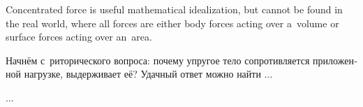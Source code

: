 

{\small
Concentrated force is useful mathematical idealization, but cannot be found in the real world, where all forces are either body forces acting over a~volume or surface forces acting over an~area.
\par}

\begin{otherlanguage}{russian}

Начнём с~риторического вопроса: почему упругое тело сопротивляется приложенной нагрузке, выдерживает её? Удачный ответ можно найти ...

...



\end{otherlanguage}



\label{para:displacementsfromdeformations}

